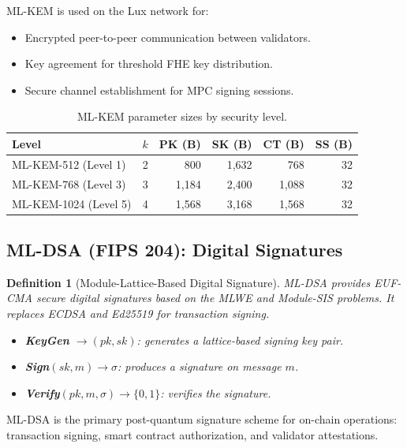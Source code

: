\documentclass[11pt,a4paper]{article}
\newtheorem{definition}{Definition}[section]
\begin{document}
ML-KEM is used on the Lux network for:
\begin{itemize}[nosep]
  \item Encrypted peer-to-peer communication between validators.
  \item Key agreement for threshold FHE key distribution.
  \item Secure channel establishment for MPC signing sessions.
\end{itemize}

\begin{table}[h]
\centering
\begin{tabular}{lrrrrr}
\toprule
\textbf{Level} & \textbf{$k$} & \textbf{PK (B)} & \textbf{SK (B)} &
\textbf{CT (B)} & \textbf{SS (B)} \\
\midrule
ML-KEM-512  (Level 1) & 2 & 800  & 1,632 & 768  & 32 \\
ML-KEM-768  (Level 3) & 3 & 1,184 & 2,400 & 1,088 & 32 \\
ML-KEM-1024 (Level 5) & 4 & 1,568 & 3,168 & 1,568 & 32 \\
\bottomrule
\end{tabular}
\caption{ML-KEM parameter sizes by security level.}
\label{tab:mlkem-sizes}
\end{table}

\subsection{ML-DSA (FIPS 204): Digital Signatures}

\begin{definition}[Module-Lattice-Based Digital Signature]
ML-DSA provides EUF-CMA secure digital signatures based on the MLWE
and Module-SIS problems.  It replaces ECDSA and Ed25519 for transaction
signing.

\begin{itemize}[nosep]
  \item \textbf{KeyGen} $\rightarrow (pk, sk)$: generates a lattice-based
        signing key pair.
  \item \textbf{Sign}$(sk, m) \rightarrow \sigma$: produces a signature
        on message $m$.
  \item \textbf{Verify}$(pk, m, \sigma) \rightarrow \{0, 1\}$: verifies
        the signature.
\end{itemize}
\end{definition}

ML-DSA is the primary post-quantum signature scheme for on-chain
operations: transaction signing, smart contract authorization, and
validator attestations.
\end{document}
